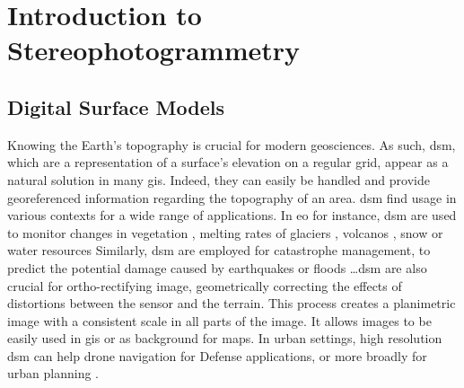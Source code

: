 \chapter{Introduction to Stereophotogrammetry}\label{chap:stereophotogrammetry}
\section{Digital Surface Models}

Knowing the Earth's topography is crucial for modern geosciences. As such, \acrfull{dsm}, which are a representation of a surface's elevation on a regular grid, appear as a natural solution in many \acrfull{gis}. Indeed, they can easily be handled and provide georeferenced information regarding the topography of an area. \acrshort{dsm} find usage in various contexts for a wide range of applications. In \acrfull{eo} for instance, \acrshort{dsm} are used to monitor changes in vegetation \cite{sadeghi_canopy_2016}, melting rates of glaciers \cite{berthier_glacier_2014, rieg_pleiades_2018}, volcanos \cite{ganci_data_2022}, snow or water resources \cite{marti_mapping_2016, gascoin_theia_2019, yamazaki_merit_2019} \etc Similarly, \acrshort{dsm} are employed for catastrophe management, to predict the potential damage caused by earthquakes or floods \cite{jenkins_physics-based_2023} \dots \acrshort{dsm} are also crucial for ortho-rectifying image, \ie geometrically correcting the effects of distortions between the sensor and the terrain. This process creates a planimetric image with a consistent scale in all parts of the image. It allows images to be easily used in \acrshort{gis} or as background for maps. In urban settings, high resolution \acrshort{dsm} can help drone navigation for Defense applications, or more broadly for urban planning \cite{velazco_3d_2012}.

